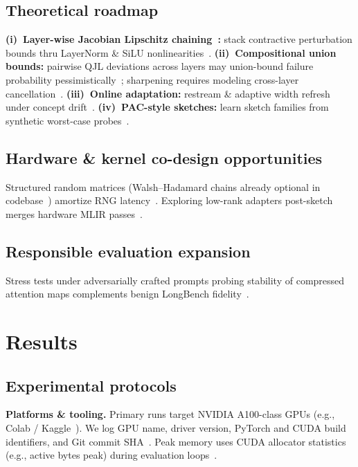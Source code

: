 \documentclass[conference]{IEEEtran}
\begin{document}
\subsection{Theoretical roadmap}

\textbf{(i)~Layer-wise Jacobian Lipschitz chaining~\cite{lipschitz2024}:} stack contractive perturbation bounds thru LayerNorm \& SiLU nonlinearities~\cite{lipschitz2024}. \textbf{(ii)~Compositional union bounds:} pairwise QJL deviations across layers may union-bound failure probability pessimistically~\cite{zandieh2024qjl}; sharpening requires modeling cross-layer cancellation~\cite{lipschitz2024}. \textbf{(iii)~Online adaptation:} restream \& adaptive width refresh under concept drift~\cite{presentation_mqjl}. \textbf{(iv)~PAC-style sketches:} learn sketch families from synthetic worst-case probes~\cite{woodruff2014}.

\subsection{Hardware \& kernel co-design opportunities}

Structured random matrices (Walsh--Hadamard chains already optional in codebase~\cite{qjlkernel}) amortize RNG latency~\cite{woodruff2014}. Exploring low-rank adapters post-sketch merges hardware MLIR passes~\cite{presentation_mqjl}.

\subsection{Responsible evaluation expansion}

Stress tests under adversarially crafted prompts probing stability of compressed attention maps complements benign LongBench fidelity~\cite{bai2023longbench}.

\section{Results}
\label{sec:results}

\subsection{Experimental protocols}

\textbf{Platforms \& tooling.} Primary runs target NVIDIA A100-class GPUs (e.g., Colab / Kaggle~\cite{presentation_mqjl}). We log GPU name, driver version, PyTorch and CUDA build identifiers, and Git commit SHA~\cite{zandieh2024aqjl-repo}. Peak memory uses CUDA allocator statistics (e.g., active bytes peak) during evaluation loops~\cite{presentation_mqjl}.
\end{document}
